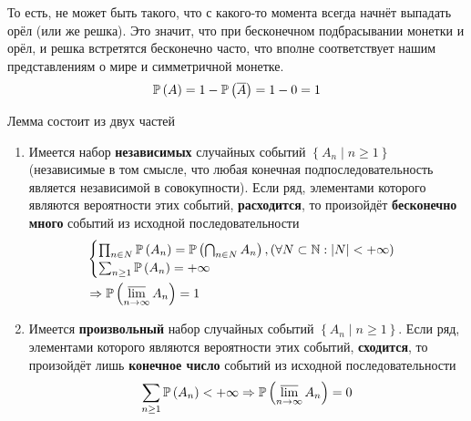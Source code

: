     То есть, не может быть такого, что с какого-то момента
    всегда начнёт выпадать орёл (или же решка).
    Это значит, что при бесконечном подбрасывании монетки
    и орёл, и решка встретятся бесконечно часто,
    что вполне соответствует нашим представлениям о мире и симметричной монетке.
    $$\mathbb{P}\left( A \right)=1-\mathbb{P}\left( \overline{A} \right)=1-0=1$$
\begin{lemma}Лемма состоит из двух частей
\begin{enumerate}[label=\alph*]
    \item Имеется набор \textbf{независимых} случайных событий
        $\left\{ A_n\mid n\ge1 \right\}$ (независимые в том смысле, что любая
        конечная подпоследовательность является независимой в совокупности).
        Если ряд, элементами которого являются вероятности этих событий,
        \textbf{расходится}, то произойдёт \textbf{бесконечно много}
        событий из исходной последовательности
        \begin{align*}
        &\begin{cases}
            \prod_{n\in N}\mathbb{P}\left( A_n \right)
            =\mathbb{P}\left( \bigcap_{n\in N}A_n \right),
            (\forall N\subset\mathbb{N}: \left|N\right|<+\infty)\\
            \sum_{n\ge 1}\mathbb{P}\left( A_n \right) = +\infty
        \end{cases}\\
        &\Rightarrow \mathbb{P}\left( \varlimsup\limits_{n\to\infty} A_n \right)=1
        \end{align*}
    \item Имеется \textbf{произвольный} набор случайных событий
        $\left\{ A_n\mid n\ge1 \right\}$.
        Если ряд, элементами которого являются вероятности этих событий,
        \textbf{сходится}, то произойдёт лишь \textbf{конечное число}
        событий из исходной последовательности
        $$\sum_{n\ge 1}\mathbb{P}\left( A_n \right) < +\infty
            \Rightarrow \mathbb{P}\left( \varlimsup\limits_{n\to\infty} A_n \right)=0$$
\end{enumerate}
\end{lemma}
